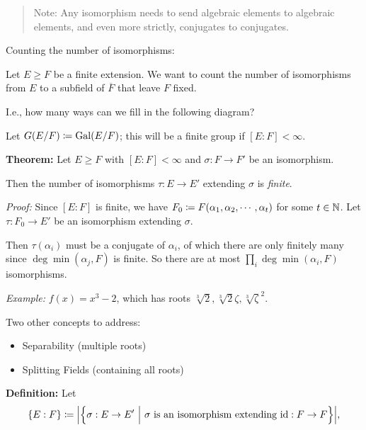 \begin{quote}
Note: Any isomorphism needs to send algebraic elements to algebraic
elements, and even more strictly, conjugates to conjugates.
\end{quote}

Counting the number of isomorphisms:

Let \(E \geq F\) be a finite extension. We want to count the number of
isomorphisms from \(E\) to a subfield of \(\overline F\) that leave
\(F\) fixed.

I.e., how many ways can we fill in the following diagram?

\begin{center}
\end{center}

Let \(G(E/F) \coloneqq \mathrm{Gal}(E/F)\); this will be a finite group if
\([E: F] < \infty\).

\textbf{Theorem:} Let \(E \geq F\) with \([E: F] < \infty\) and
\(\sigma: F \to F'\) be an isomorphism.

Then the number of isomorphisms \(\tau: E \to E'\) extending \(\sigma\)
is \emph{finite}.

\emph{Proof:} Since \([E: F]\) is finite, we have
\(F_0 \coloneqq F(\alpha_1, \alpha_2, \cdots, \alpha_t)\) for some
\(t\in {\mathbb{N}}\). Let \(\tau: F_0 \to E'\) be an isomorphism extending
\(\sigma\).

Then \(\tau(\alpha_i)\) must be a conjugate of \(\alpha_i\), of which
there are only finitely many since \(\deg \min(\alpha_j, F)\) is finite.
So there are at most \(\prod_i \deg\min(\alpha_i, F)\) isomorphisms.

\emph{Example:} \(f(x) = x^3 - 2\), which has roots
\(\sqrt[3] 2, \sqrt[3] 2 \zeta, \sqrt[3] \zeta^2\).

Two other concepts to address:

\begin{itemize}
\item
  Separability (multiple roots)
\item
  Splitting Fields (containing all roots)
\end{itemize}

\textbf{Definition:} Let \[
\left\{{E: F}\right\} \coloneqq
{\left\lvert { \left\{{\sigma: E \to E' {~\mathrel{\Big|}~}\sigma \text{ is an isomorphism extending } \text{id}: F \to F}\right\}} \right\rvert}
,\]


